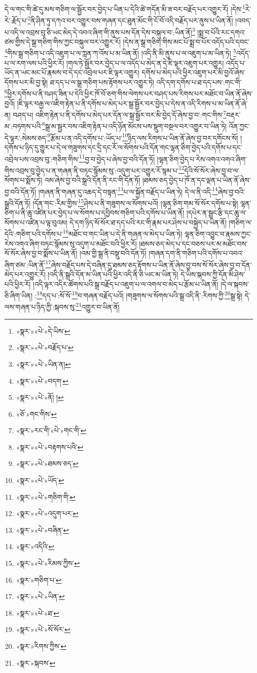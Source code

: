 དེ་ལ་གང་གི་ཚེ་དུ་མས་གཅིག་ལ་སྦྱོར་བར་བྱེད་པ་ཡིན་པ་དེའི་ཚེ་གདོན་མི་ཟ་བར་བརྗོད་པར་འགྱུར་རོ། །དེས་\footnote{«སྣར་»«པེ་»དེ་ཡིས་}རེ་རེ་:རྗོད་པ་\footnote{«སྣར་»«པེ་»བརྗོད་པ་}ནི་ཤིན་ཏུ་དཀའ་བར་འགྱུར་བས་གཞན་དང་ཐུན་མོང་གི་ངོ་བོ་འདི་བརྗོད་པར་ནུས་པ་ཡིན་ནོ། །འབད་པ་འདི་ལ་འབྲས་བུ་ཅི་ཡང་མེད་དེ་འབའ་ཞིག་གི་ནུས་པས་དོན་དེས་བསྐུལ་བ་:ཡིན་ནོ།\footnote{«སྣར་»«པེ་»ཡིན་ན།} །སྨྲ་བ་པོའི་རང་དགའ་ཙམ་གྱིས་དེ་སྒྲ་གཅིག་གིས་ཀྱང་བསྐུལ་བར་འགྱུར་རོ། །དེས་ན་སྒྲ་གཅིག་གིས་མང་པོ་སྨྲ་བ་པོར་འདོད་པའི་དབང་\footnote{«སྣར་»«པེ་»བདག་}གིས་སྒྲ་གཅིག་པ་འདི་འཇུག་པ་ལ་ཀླན་ཀ་འོས་པ་མ་ཡིན་ནོ། །འདི་ནི་མི་ནུས་པ་ལ་འཇུག་པ་མ་ཡིན་ཏེ། \footnote{«སྣར་»«པེ་»ནོ། ། }འདོད་པ་ལ་རག་ལས་པའི་ཕྱིར་རོ། །གལ་ཏེ་སྦྱོར་བར་བྱེད་པ་ལ་འདོད་པ་མེད་ན་དེ་ཇི་ལྟར་འཇུག་པར་འགྱུར། འདོད་པ་ཡོད་ན་ཡང་མང་པོ་རྣམས་བ་དེ་དང་འབྲེལ་པར་ཇི་ལྟར་འགྱུར། དགོས་པ་མེད་པའི་ཕྱིར་འཇུག་པར་མི་བྱའོ་ཞེས་དོགས་པར་མི་བྱ་སྟེ། ཐ་དད་པ་ལ་སྒྲ་གཅིག་པས་རྟོགས་པར་འགྱུར་ཏེ། འདི་དག་དགོས་པ་ཐ་དད་པས་:གང་གི་\footnote{«ཅོ་»གང་གིས་}ཕྱིར་དགོས་པ་ནི་བཤད་ཟིན་པ་དེའི་ཕྱིར་ཁོ་བོ་ཅག་གིས་ལེགས་པར་བཤད་པས་རིགས་པར་མཐོང་བ་ཡིན་ནོ་ཞེས་བྱའོ། །ཇི་ལྟར་བརྒྱ་ལ་འཇིག་རྟེན་པ་ནི་དགོས་པ་མེད་པར་སྒྲ་སྦྱོར་བར་བྱེད་པ་དེས་ན་འདི་རིགས་པ་མ་ཡིན་ནོ་ཞེ་ན། བཤད་པ། འཇིག་རྟེན་པ་ནི་དགོས་པ་མེད་པར་དོན་ལ་སྒྲ་སྦྱོར་བར་མི་བྱེད་དོ་ཞེས་བྱ་བ་:གང་གིས་\footnote{«སྣར་»རང་གི་«པེ་»གང་གི་}བརྡར་མ་:བཏགས་པའི་\footnote{«སྣར་»«པེ་»བརྟགས་པའི་}སྒྲ་མ་སྦྱར་བས་འཇིག་རྟེན་པ་འདི་ཉོན་མོངས་པས་སྡུག་བསྔལ་བར་འགྱུར་བ་ཡིན་ཏེ། འོན་ཀྱང་དེ་ལྟར་:སེམས་ཅད་\footnote{«སྣར་»«པེ་»ཐམས་ཅད་}རྩོམ་པ་ན་འདི་དགོས་པ་:ཡོད་པ་\footnote{«སྣར་»«པེ་»ཡོད་}ཉིད་ལས་རིགས་པ་ཡིན་ནོ་ཞེས་བྱ་བར་དགོངས་སོ། །དགོས་པ་ཉིད་དུ་གྱུར་པ་དེ་ལ་གཟུགས་དང་དྲི་དང་རོ་ལ་སོགས་པའི་དོན་གང་ལྷན་ཅིག་བྱེད་པའི་དགོས་པ་དང་འབྲེལ་པས་འབྲས་བུ་:གཅིག་གིས་\footnote{«སྣར་»«པེ་»གཅིག་གི་}བྱ་བ་བྱེད་པ་ཞེས་བྱ་བའི་དོན་ཏོ། །ལྷན་ཅིག་བྱེད་པ་རེས་འགའ་འགའ་ཞིག་གིས་འབྲས་བུ་བྱེད་པ་ན་གཞན་ནི་བཏང་སྙོམས་སུ་:འདུག་པར་འགྱུར་རོ་སྙམ་པ་\footnote{«སྣར་»«པེ་»འདུག་པར་}དེའི་སོ་སོར་ཞེས་བྱ་བ་ལ་སོགས་པ་སྨོས་ཏེ། འམ་ཞེས་བྱ་བའི་སྒྲའི་དོན་ནི་རང་གི་དོན་ཏོ། །ཐམས་ཅད་བྱེད་པ་ཁོ་ན་དང་ལྡན་པ་ཡིན་ནོ་ཞེས་བྱ་བའི་དོན་ཏོ། །གཞན་ནི་གཞན་དུ་འཆད་དེ་བསྟན་\footnote{«སྣར་»«པེ་»བཞིན་}པ་ལ་སྐྱོན་བརྗོད་པ་ཡིན་ཏེ། དེ་ལ་ནི་འདི་\footnote{«སྣར་»འདིའི་}ཞེས་བྱ་བའི་སྒྲའི་དོན་ཏོ། །དོན་གང་:རིམ་གྱིས་\footnote{«སྣར་»«པེ་»རིམས་ཀྱིས་}ཤེས་པ་ནི་གཟུགས་ལ་སོགས་པའོ། །ལྷན་ཅིག་གམ་སོ་སོར་དགོས་པ་སྟེ། ལྷན་ཅིག་པ་ནི་ཆུ་འཛིན་པར་བྱེད་པ་ལ་སོགས་པ་དབྱིབས་གཅིག་པའི་དགོས་པ་ཡིན་ནོ། །དཔེར་ན་སྦྲང་རྩི་དང་ཆུ་ལ་སོགས་པ་འཛིན་པ་ལྟ་བུའམ། དེ་དག་ཉིད་སོ་སོར་ཐ་དད་པའི་རང་གི་རྣམ་པར་ཤེས་པ་བསྐྱེད་པ་ཡིན་ནོ། །གཅིག་ལ་དེའི་:གཅིག་པའི་དགོས་པ་\footnote{«སྣར་»གཅིག་པ་}མཐོང་བ་གང་ཡིན་པ་དེ་ནི་གཞན་ལ་མེད་པ་ཡིན་ཏེ། ལྷན་ཅིག་འབྱུང་བ་རྣམས་ཀྱང་རེས་འགའ་ཞིག་བཏང་སྙོམས་སུ་འདུག་པ་མཐོང་བའི་ཕྱིར་རོ། །ཐམས་ཅད་མེད་པ་དང་བཅས་པར་མ་མཐོང་བས་སོ་སོར་ཞེས་བྱ་བ་སྨོས་པ་ཡིན་ནོ། །འམ་གྱི་སྒྲ་ནི་བསྡུ་བའི་དོན་ཏོ། །གཞན་དག་ནི་གཅིག་པའི་དགོས་པ་འབའ་ཞིག་ཙམ་:ཡིན་ནོ་\footnote{«སྣར་»«པེ་»ཡིན་}ཞེས་བརྗོད་པས་དེ་བཞིན་དུ་ཐམས་ཅད་རྟོགས་པ་ཡིན་ནོ་ཞེས་བྱ་བས་སོ་སོར་ཞེས་བྱ་བ་དོན་མེད་པར་འགྱུར་རོ། །འདི་ནི་སྒྲའི་དོན་མ་ཡིན་པའི་ཕྱིར་འདི་ནི་ཅི་ཡང་མ་ཡིན་ཏེ། དེ་ཡིས་སྐབས་ཀྱི་དོན་མི་ཤེས་པའི་ཕྱིར་རོ། །འདི་ལྟར་འདིར་ཚོགས་པའི་སྒྲ་བརྗོད་པ་འཇུག་པ་ལ་འགལ་བ་མེད་པ་རྩོམ་པ་ཡིན་ནོ། །དེ་ལ་སྐབས་ཅི་ཞིག་ཡིན། :\footnote{«སྣར་»«པེ་»ཐ་}དད་པ་:སོ་སོ་\footnote{«སྣར་»«པེ་»སོ་སོར་}བ་གཞན་བརྗོད་པའོ། །གཟུགས་ལ་སོགས་པའི་སྒྲ་འདི་ནི་:རིགས་ཀྱི་\footnote{«སྣར་»རིགས་ཀྱིས་}སྒྲ་སྟེ། དེ་ལས་གཞན་པ་ཉིད་ཀྱི་:སྐབས་སུ་\footnote{«སྣར་»སྐབས་}འགྱུར་བ་ཡིན་ནོ། 